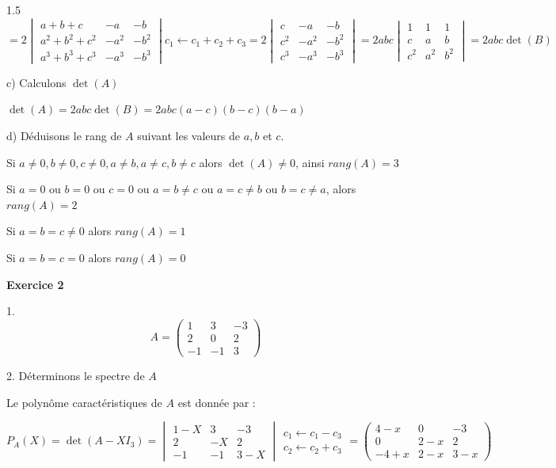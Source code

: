 \documentclass[12pt]{article}
\begin{document}
\begin{spacing}{1.5}
$=2\begin{vmatrix}
a+b+c & -a & -b \\ 
a^2+b^2+c^2 & -a^2 & -b^2 \\ 
a^3+b^3+c^3& -a^3 &-b^3
\end{vmatrix}c_1\longleftarrow c_1+c_2+c_3=2\begin{vmatrix}
c & -a & -b \\ 
c^2 & -a^2 & -b^2 \\ 
c^3& -a^3 &-b^3
\end{vmatrix}=2abc\begin{vmatrix}
1 & 1 & 1 \\ 
c & a & b \\ 
c^2& a^2 &b^2
\end{vmatrix}=2abc\det(B)$

c) Calculons $\det(A)$

$\det(A)=2abc\det(B)=2abc(a-c)(b-c)(b-a)$

d) Déduisons le rang de $A$ suivant les valeurs de $a, b$ et $c$.


Si $a\neq 0,b\neq 0,c\neq 0,a\neq b,a\neq c,b\neq c$ alors $\det(A)\neq 0$, ainsi $rang(A)=3$

Si $a=0$ ou $b=0$ ou $c=0$ ou $a=b\neq c$ ou $a=c\neq b$ ou $b=c\neq a$, alors $rang(A)=2$

Si $a=b=c\neq 0$ alors $rang(A)=1$

Si $a=b=c=0$ alors $rang(A)=0$

\textbf{Exercice 2}

1. \[A=\begin{pmatrix}
1 & 3 & -3 \\ 
2 & 0 & 2 \\ 
-1 & -1 & 3
\end{pmatrix}\]

2. Déterminons le spectre de $A$

Le polynôme caractéristiques de $A$ est donnée par : 

$P_A(X)=\det(A-XI_3)=\begin{vmatrix}
1-X & 3 & -3 \\ 
2 & -X & 2 \\ 
-1 & -1 & 3-X
\end{vmatrix}\begin{array}{c}
c_1\longleftarrow c_1-c_3\\
c_2\longleftarrow c_2+c_3
\end{array} =\begin{pmatrix}
4-x & 0 & -3 \\ 
0 & 2-x & 2 \\ 
-4+x & 2-x & 3-x
\end{pmatrix}$


\end{spacing}
\end{document}
